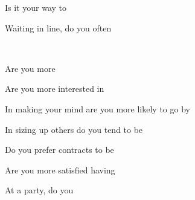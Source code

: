 \documentclass[english,pdf,pagemark,stamp,globalid=\candidateID,oneside]{sdaps}
\begin{document}
\begin{questionnaire}
\begin{multicols}{2}
\begin{choicequestion}[2]{Is it your way to}
\end{choicequestion}

\begin{choicequestion}[2]{Waiting in line, do you often}
\end{choicequestion}
\\
\begin{choicequestion}[2]{Are you more}
\end{choicequestion}

\begin{choicequestion}[2]{Are you more interested in}
\end{choicequestion}

\begin{choicequestion}[2]{In making your mind are you more likely to go by}
\end{choicequestion}

\begin{choicequestion}[2]{In sizing up others do you tend to be}
\end{choicequestion}

\begin{choicequestion}[2]{Do you prefer contracts to be}
\end{choicequestion}

\begin{choicequestion}[2]{Are you more satisfied having}
\end{choicequestion}

\begin{choicequestion}[2]{At a party, do you}
\end{choicequestion}


\end{multicols}
\end{questionnaire}
\end{document}

